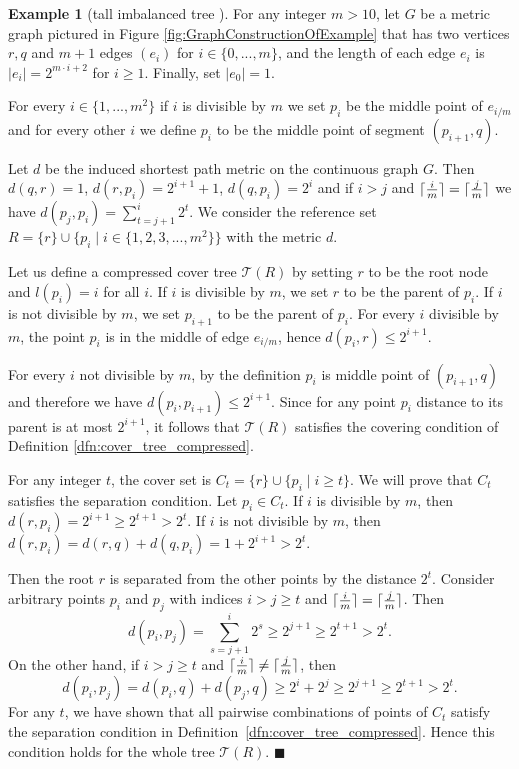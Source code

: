 \documentclass[a4paper,UKenglish,cleveref, autoref]{lipics-v2019}
\numberwithin{algocf}{section}
\theoremstyle{definition}
\theoremstyle{definition}
\newtheorem{exa}[algocf]{Example}
\theoremstyle{definition}
\theoremstyle{plain}
\DeclarePairedDelimiter\ceil{\lceil}{\rceil}
\newcommand{\T}{\mathcal{T}}
\newcommand{\bs}{\hfill $\blacksquare$}
\begin{document}
\begin{exa}[tall imbalanced tree {\cite[Example~3.1]{elkin2021new}}]
\label{exa:tall_imbalanced_tree}
For any integer $m > 10$, let $G$ be a metric graph pictured in Figure \ref{fig:GraphConstructionOfExample} that has two vertices $r,q$ and $m+1$ edges $(e_i)$ for $i \in \{0, ..., m\}$, and the length of each edge $e_i$ is $|e_i| = 2^{m \cdot i +2}$ for $i \geq 1$.
Finally, set $|e_0| = 1$. 
\medskip

For every $i \in \{1, ..., m^2\}$ if $i$ is divisible by $m$ we set $p_{i}$ be the middle point of $e_{i / m}$ and for every other $i$ we define $p_i$ to be the middle point of segment $(p_{i+1}, q)$. 
\medskip

Let $d$ be the induced shortest path metric on the continuous graph $G$.
Then $d(q,r) = 1$, $d(r, p_{i}) = 2^{i+1} + 1$, $d(q,p_{i}) = 2^{i} $ and if $i > j $ and $\ceil{\frac{i}{m}} = \ceil{\frac{j}{m}}$ we have $ d(p_{j}, p_{i})  = \sum\limits_{t = j+1}^{i} 2^{t}$. 
We consider the reference set $R = \{r\} \cup \{p_{i} \mid i \in \{1,2,3,...,m^2\} \}$ with the metric $d$.
\medskip

Let us define a compressed cover tree $\T(R)$ by setting $r$ to be the root node and $l(p_{i}) = i$ for all $i$. 
If $i$ is divisible by $m$, we set  $r$ to be the parent of $p_{i}$. 
If $i$ is not divisible by $m$, we set $p_{i+1}$ to be the parent of $p_{i}$. 
For every $i$ divisible by $m$, the point $p_i$ is in the middle of edge $e_{i / m}$, hence $d(p_{i}, r) \leq 2^{i + 1}$.
\medskip
 
For every $i$ not divisible by $m$, by the definition $p_i$ is middle point of $(p_{i+1},q)$ and therefore we have $d(p_i, p_{i+1}) \leq 2^{i+1}$. Since for any point $p_i$ distance to its parent is at most $2^{i+1}$, it follows that $\T(R)$ satisfies the covering condition of Definition \ref{dfn:cover_tree_compressed}. 
\medskip

For any integer $t$, the cover set is $C_t = \{r\} \cup \{ p_i \mid i \geq t\}$. 
We will prove that $C_t$ satisfies the separation condition. 
Let $p_{i} \in C_t$.
If $i$ is divisible by $m$, then 
$d(r, p_i) = 2^{i+1} \geq 2^{t + 1} > 2^t.$ 
If $i$ is not divisible by $m$, then
$d(r, p_{i}) = d(r,q) + d(q,p_{i})  = 1 + 2^{i+1}  > 2^{t}$. 
\medskip

Then the root $r$ is separated from the other points by the distance $2^t$. 
Consider arbitrary points $p_{i}$ and $p_{j}$ with indices $i > j \geq t $ and $\ceil{\frac{i}{m}} = \ceil{\frac{j}{m}}$.
Then
$$d(p_{i}, p_{j}) = \sum^{i}_{s = j+1} 2^{s}  \geq 2^{j+1} \geq 2^{t+1} > 2^{t}.$$
On the other hand, if $i > j \geq t $ and $\ceil{\frac{i}{m}} \neq \ceil{\frac{j}{m}}$, then
$$d(p_{i} , p_{j}) = d(p_{i},q) + d(p_{j} ,q)  \geq  2^{i} + 2^{j} \geq 2^{j+1} \geq 2^{t+1} > 2^t.$$
For any $t$, we have shown that all pairwise combinations of points of $C_{t}$ satisfy the separation condition in Definition~\ref{dfn:cover_tree_compressed}.
Hence this condition holds for the whole tree $\T(R)$. 
\bs
\end{exa}
\end{document}
